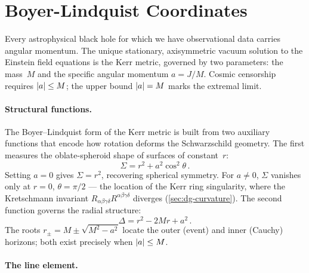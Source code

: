 \section{Boyer-Lindquist Coordinates}
\label{sec:kerr-bl}

Every astrophysical black hole for which we have observational data
carries angular momentum.  The unique stationary, axisymmetric vacuum
solution to the Einstein field equations is the Kerr metric, governed
by two parameters: the mass~$M$ and the specific angular momentum
$a = J/M$.  Cosmic censorship requires $\left\lvert a \right\rvert \leq M$; the upper
bound $\left\lvert a \right\rvert = M$ marks the extremal limit.

\paragraph{Structural functions.}

The Boyer--Lindquist form of the Kerr metric is built from two
auxiliary functions that encode how rotation deforms the
Schwarzschild geometry.  The first measures the oblate-spheroid shape
of surfaces of constant~$r$:
%
\begin{equation}
  \Sigma = r^2 + a^2 \cos^2\!\theta \,.
  \label{eq:kerr-Sigma}
\end{equation}
%
Setting $a = 0$ gives $\Sigma = r^2$, recovering spherical symmetry.
For $a \neq 0$, $\Sigma$ vanishes only at $r = 0$, $\theta = \pi/2$
--- the location of the Kerr ring singularity, where the Kretschmann
invariant
$R_{\alpha\beta\gamma\delta}R^{\alpha\beta\gamma\delta}$ diverges
(\cref{sec:dg-curvature}).  The second function governs the radial
structure:
%
\begin{equation}
  \Delta = r^2 - 2Mr + a^2 \,.
  \label{eq:kerr-Delta}
\end{equation}
%
The roots $r_\pm = M \pm \sqrt{M^2 - a^2}$ locate the outer (event)
and inner (Cauchy) horizons; both exist precisely when
$\left\lvert a \right\rvert \leq M$.

\paragraph{The line element.}

